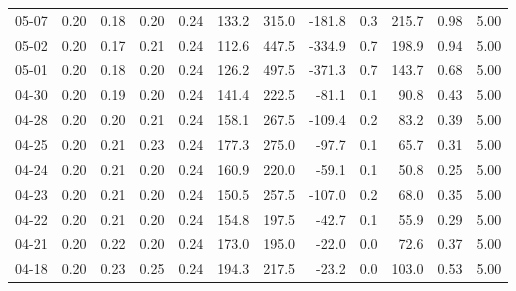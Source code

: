 \begin{threeparttable}
{\begin{tabular}{lrrrrrrrrrrr}
  05-07 &          0.20 &          0.18 &          0.20 &        0.24 &               133.2 &               315.0 &     -181.8 &                 0.3 &            215.7 &            0.98 &                   5.00 \\
  05-02 &          0.20 &          0.17 &          0.21 &        0.24 &               112.6 &               447.5 &     -334.9 &                 0.7 &            198.9 &            0.94 &                   5.00 \\
  05-01 &          0.20 &          0.18 &          0.20 &        0.24 &               126.2 &               497.5 &     -371.3 &                 0.7 &            143.7 &            0.68 &                   5.00 \\
  04-30 &          0.20 &          0.19 &          0.20 &        0.24 &               141.4 &               222.5 &      -81.1 &                 0.1 &             90.8 &            0.43 &                   5.00 \\
  04-28 &          0.20 &          0.20 &          0.21 &        0.24 &               158.1 &               267.5 &     -109.4 &                 0.2 &             83.2 &            0.39 &                   5.00 \\
  04-25 &          0.20 &          0.21 &          0.23 &        0.24 &               177.3 &               275.0 &      -97.7 &                 0.1 &             65.7 &            0.31 &                   5.00 \\
  04-24 &          0.20 &          0.21 &          0.20 &        0.24 &               160.9 &               220.0 &      -59.1 &                 0.1 &             50.8 &            0.25 &                   5.00 \\
  04-23 &          0.20 &          0.21 &          0.20 &        0.24 &               150.5 &               257.5 &     -107.0 &                 0.2 &             68.0 &            0.35 &                   5.00 \\
  04-22 &          0.20 &          0.21 &          0.20 &        0.24 &               154.8 &               197.5 &      -42.7 &                 0.1 &             55.9 &            0.29 &                   5.00 \\
  04-21 &          0.20 &          0.22 &          0.20 &        0.24 &               173.0 &               195.0 &      -22.0 &                 0.0 &             72.6 &            0.37 &                   5.00 \\
  04-18 &          0.20 &          0.23 &          0.25 &        0.24 &               194.3 &               217.5 &      -23.2 &                 0.0 &            103.0 &            0.53 &                   5.00 \\

\end{tabular}}
\end{threeparttable}
